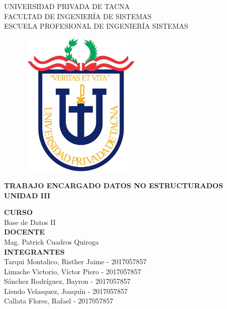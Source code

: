 \documentclass[12pt,a4paper,oneside]{book}
\begin{document}
	
	\thispagestyle{empty} 
	
	\begin{center} 
		\LARGE{UNIVERSIDAD PRIVADA DE TACNA} \\[0.5cm] 
		\Large{FACULTAD DE INGENIERÍA DE SISTEMAS}\\[0.5cm] 
		\large{ ESCUELA PROFESIONAL DE INGENIERÍA SISTEMAS} 
	\end{center}
	
	\begin{figure}[htb]
		\centering \includegraphics[width=6cm, height=7cm]{img/uptlogo.jpg}
	\end{figure}
	
	\begin{center} 
			\LARGE{\bf TRABAJO ENCARGADO \newline DATOS NO ESTRUCTURADOS \newline UNIDAD III }\\ \vspace{.25cm}
		
	\end{center}

	\begin{center} 
		
		\textbf {CURSO}\\ 
		\large Base de Datos II \\
		
		\textbf {DOCENTE}\\
		\large Mag. Patrick Cuadros Quiroga\\
	
		\textbf {INTEGRANTES}\\
		\large Tarqui Montalico, Risther Jaime - 2017057857 \\
		\large Limache Victorio, V\'ictor Piero - 2017057857 \\
		\large S\'anchez Rodr\'iguez, Bayron - 2017057857 \\
		\large Liendo Velasquez, Joaqu\'in - 2017057857 \\
		\large Callata Flores, Rafael - 2017057857 \\
		
	\end{center}
\end{document}
